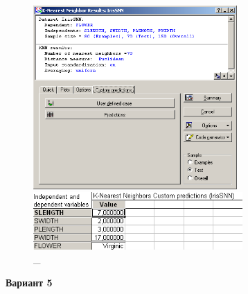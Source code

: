 \begin{figure}[!h]
  \centering

  \begin{minipage}{0.49\textwidth}
    \centering

    \includegraphics[height=7cm]
    {inc/ex_30.PNG}

    \caption{\_}

    \label{fig:23}
  \end{minipage}
  \begin{minipage}{0.49\textwidth}
    \centering

    \includegraphics[width=8cm]
    {inc/ex_31.PNG}

    \caption{\_}

    \label{fig:24}
  \end{minipage}
\end{figure}

\newpage

\begin{center}
  \textbf{Вариант 5}
\end{center}





